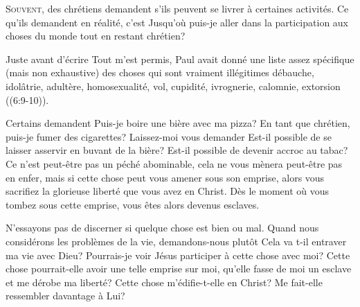 


\lettrine{S}{ouvent}, 
 des chrétiens demandent s'ils peuvent se livrer
 à certaines activités. Ce qu'ils demandent en réalité,
 c'est\frcolon{}
 \Og Jusqu'où puis-je aller dans la participation
 aux choses du monde tout en restant chrétien? \Fg{}

Juste avant d'écrire \Og Tout m'est permis, \Fg{}
 Paul avait donné une liste assez spécifique
 (mais non exhaustive) des choses qui sont vraiment illégitimes\frcolon{}
 débauche, idolâtrie, adultère, homosexualité,
 vol, cupidité, ivrognerie, calomnie, extorsion
 ((6:9-10)).


Certains demandent\frcolon{}
 \Og Puis-je boire une bière avec ma pizza?
 En tant que chrétien, puis-je fumer des cigarettes? \Fg{}
 Laissez-moi vous demander\frcolon{} 
 \Og Est-il possible de se laisser asservir en buvant de la bière?
 Est-il possible de devenir accroc au tabac? \Fg{}
 Ce n'est peut-être pas un péché abominable,
 cela ne vous mènera peut-être pas en enfer,
 mais si cette chose peut vous amener sous son emprise,
 alors vous sacrifiez la glorieuse liberté que vous avez en Christ.
 Dès le moment où vous tombez sous cette emprise,
 vous êtes alors devenus esclaves.

N'essayons pas de discerner si quelque chose est bien ou mal.
 Quand nous considérons les problèmes de la vie,
 demandons-nous plutôt\frcolon{} \Og {}
 Cela va t-il entraver ma vie avec Dieu?
 Pourrais-je voir Jésus participer à cette chose avec moi?
 Cette chose pourrait-elle avoir une telle emprise sur moi,
 qu'elle fasse de moi un esclave et me dérobe ma liberté?
 Cette chose m'édifie-t-elle en Christ?
 Me fait-elle ressembler davantage à Lui? \Fg{}

\dvrule




